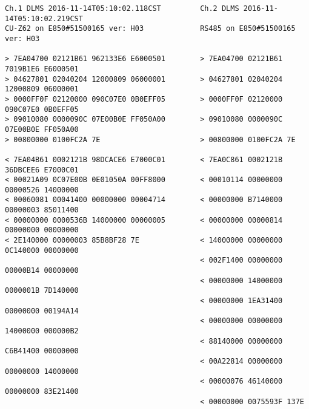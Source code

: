 \documentclass[11pt,a4paper]{article}
\begin{document}
\lstset{escapechar=@,style=datagram}
\begin{lstlisting}
Ch.1 DLMS 2016-11-14T05:10:02.118CST         Ch.2 DLMS 2016-11-14T05:10:02.219CST  
CU-Z62 on E850#51500165 ver: H03             RS485 on E850#51500165 ver: H03 
                                             
> 7EA04700 02121B61 962133E6 E6000501        > 7EA04700 02121B61 7019B1E6 E6000501 
> 04627801 02040204 12000809 06000001        > 04627801 02040204 12000809 06000001
> 0000FF0F 02120000 090C07E0 0B0EFF05        > 0000FF0F 02120000 090C07E0 0B0EFF05
> 09010080 0000090C 07E00B0E FF050A00        > 09010080 0000090C 07E00B0E FF050A00
> 00800000 0100FC2A 7E                       > 00800000 0100FC2A 7E               
                                             
< 7EA04B61 0002121B 98DCACE6 E7000C01        < 7EA0C861 0002121B 36DBCEE6 E7000C01
< 00021A09 0C07E00B 0E01050A 00FF8000        < 00010114 00000000 00000526 14000000
< 00060081 00041400 00000000 00004714        < 00000000 B7140000 00000003 85011400
< 00000000 0000536B 14000000 00000005        < 00000000 00000814 00000000 00000000
< 2E140000 00000003 85B8BF28 7E              < 14000000 00000000 0C140000 00000000
                                             < 002F1400 00000000 00000B14 00000000
                                             < 00000000 14000000 0000001B 7D140000
                                             < 00000000 1EA31400 00000000 00194A14
                                             < 00000000 00000000 14000000 000000B2
                                             < 88140000 00000000 C6B41400 00000000
                                             < 00A22814 00000000 00000000 14000000
                                             < 00000076 46140000 00000000 83E21400
                                             < 00000000 0075593F 137E             
\end{lstlisting}
\end{document}
